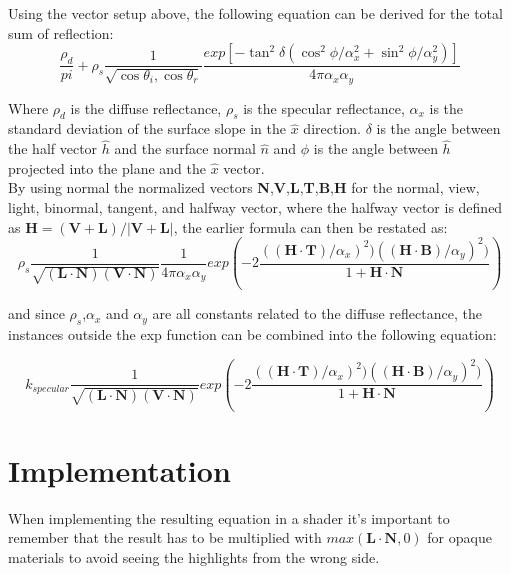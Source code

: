 \documentclass{acmsiggraph}               %
\begin{document}
Using the vector setup above, the following equation can be derived for the
total sum of reflection:
\begin{equation}
  \frac{\rho_d}{pi} + \rho_s \frac{1}{\sqrt{\cos{\theta_i},\cos{\theta_r}}}
  \frac{exp[-\tan^2\delta(\cos^2\phi/\alpha_x^2 +
  \sin^2\phi/\alpha_y^2)]}{4\pi\alpha_x\alpha_y}
\end {equation}

Where $\rho_d$ is the diffuse reflectance, $\rho_s$ is the specular
reflectance, $\alpha_x$ is the standard deviation of the surface slope in the
$\hat{x}$ direction. $\delta$ is the angle between the half vector $\hat{h}$
and the surface normal $\hat{n}$ and $\phi$ is the angle between
$\hat{h}$ projected into the plane and the $\hat{x}$ vector.
\\

By using normal the normalized vectors
\textbf{N},\textbf{V},\textbf{L},\textbf{T},\textbf{B},\textbf{H} for the
normal, view, light, binormal, tangent, and halfway vector, where the halfway vector
is defined as $\textbf{H} = (\textbf{V}+\textbf{L})/|\textbf{V}+\textbf{L}|$,
the earlier formula can then be restated as:
\begin{equation}
  \rho_s \frac{1}{\sqrt{(\textbf{L}\cdot\textbf{N})(\textbf{V}\cdot\textbf{N})}}
  \frac{1}{4\pi\alpha_x\alpha_y} exp (-2\frac{((\textbf{H}\cdot\textbf{T})/\alpha_x)^2)
((\textbf{H}\cdot\textbf{B})/\alpha_y)^2)} {1 + \textbf{H}\cdot\textbf{N}})
\end {equation}

and since $\rho_s$,$\alpha_x$ and $\alpha_y$ are all constants related to the
diffuse reflectance, the instances outside the exp function can be combined
into the following equation:

\begin{equation}
  k_{specular} \frac{1}{\sqrt{(\textbf{L}\cdot\textbf{N})(\textbf{V}\cdot\textbf{N})}}
  exp (-2\frac{((\textbf{H}\cdot\textbf{T})/\alpha_x)^2)
((\textbf{H}\cdot\textbf{B})/\alpha_y)^2)} {1 + \textbf{H}\cdot\textbf{N}})
\end {equation}

\section{Implementation}

When implementing the resulting equation in a shader it's important to remember
that the result has to be multiplied with $max(\textbf{L}\cdot\textbf{N},0)$ for
opaque materials to avoid seeing the highlights from the wrong side.
\end{document}
